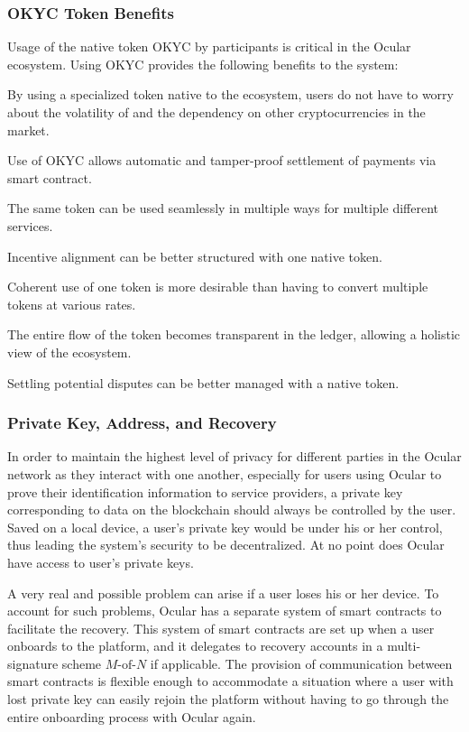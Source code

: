 \documentclass[a4paper]{article}
\let\tempone\itemize
\let\temptwo\enditemize
\renewenvironment{itemize}{\tempone\addtolength{\itemsep}{-5pt}}{\temptwo}
\begin{document}
\subsubsection*{OKYC Token Benefits}
Usage of the native token OKYC by participants is critical in the Ocular ecosystem. Using OKYC provides the following benefits to the system:
\begin{itemize}
\item By using a specialized token native to the ecosystem, users do not have to worry about the volatility of and the dependency on other cryptocurrencies in the market.
\item Use of OKYC allows automatic and tamper-proof settlement of payments via smart contract.
\item The same token can be used seamlessly in multiple ways for multiple different services.
\item Incentive alignment can be better structured with one native token.
\item Coherent use of one token is more desirable than having to convert multiple tokens at various rates.
\item The entire flow of the token becomes transparent in the ledger, allowing a holistic view of the ecosystem.
\item Settling potential disputes can be better managed with a native token.
\end{itemize}

\subsubsection*{Private Key, Address, and Recovery}
In order to maintain the highest level of privacy for different parties in the Ocular network as they interact with one another, especially for users using Ocular to prove their identification information to service providers, a private key corresponding to data on the blockchain should always be controlled by the user. Saved on a local device, a user's private key would be under his or her control, thus leading the system's security to be decentralized. At no point does Ocular have access to user's private keys. 

A very real and possible problem can arise if a user loses his or her device. To account for such problems, Ocular has a separate system of smart contracts to facilitate the recovery. This system of smart contracts are set up when a user onboards to the platform, and it delegates to recovery accounts in a multi-signature scheme $M\text{-of-}N$ if applicable. The provision of communication between smart contracts is flexible enough to accommodate a situation where a user with lost private key can easily rejoin the platform without having to go through the entire onboarding process with Ocular again.
\end{document}
